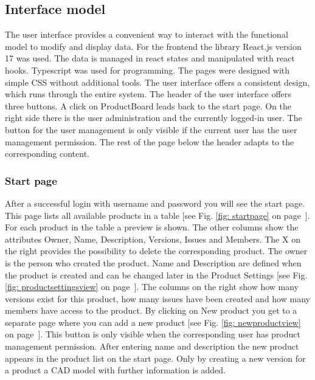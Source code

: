 

    \subsection*{Interface model} 
    The user interface provides a convenient way to interact with the functional model to modify and display data. For the frontend the library React.js version 17 was used. The data is managed in react states and manipulated with react hooks. Typescript was used for programming. The pages were designed with simple CSS without additional tools. The user interface offers a consistent design, which runs through the entire system. The header of the user interface offers three buttons. A click on ProductBoard leads back to the start page. On the right side there is the user administration and the currently logged-in user. The button for the user management is only visible if the current user has the user management permission. The rest of the page below the header adapts to the corresponding content.


    \subsubsection*{Start page}
    After a successful login with username and password you will see the start page. This page lists all available products in a table [see Fig. \ref{fig: startpage} on page~\pageref{fig: startpage}]. For each product in the table a preview is shown. The other columns show the attributes Owner, Name, Description, Versions, Issues and Members. The X on the right provides the possibility to delete the corresponding product. The owner is the person who created the product. Name and Description are defined when the product is created and can be changed later in the Product Settings [see Fig. \ref{fig: productsettingsview} on page~\pageref{fig: productsettingsview}]. The columns on the right show how many versions exist for this product, how many issues have been created and how many members have access to the product. By clicking on New product you get to a separate page where you can add a new product [see Fig. \ref{fig: newproductview} on page~\pageref{fig: newproductview}]. This button is only visible when the corresponding user has product management permission. After entering name and description the new product appears in the product list on the start page. Only by creating a new version for a product a CAD model with further information is added.

